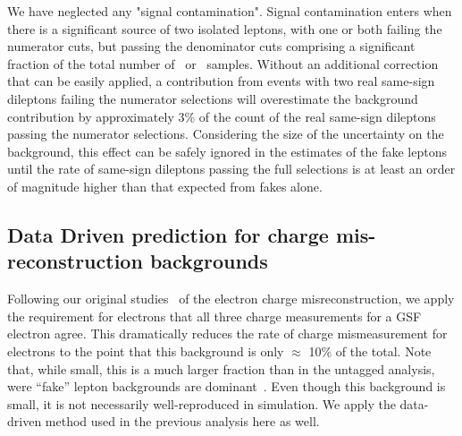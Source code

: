 We have neglected any "signal contamination". 
Signal contamination enters when there is a significant
source of two isolated leptons, with one or both failing the numerator cuts, but passing the denominator cuts
comprising  a significant fraction of the total number of \nNoNu\ or \nNoNo\ samples. 
Without an additional correction that can be easily applied,
a contribution from events with two real same-sign dileptons failing the numerator selections
 will overestimate the background contribution by approximately 3\% of the count of
the real same-sign dileptons passing the numerator selections.
Considering the size of the uncertainty on the background,
this effect can be safely ignored in the estimates 
of the fake leptons until the rate of same-sign dileptons passing the full
selections is at least an order of magnitude  higher than that expected
from fakes alone.


\subsection{Data Driven prediction for charge mis-reconstruction backgrounds}
\label{sec:flips}


Following our original studies~\cite{sspaper2010} of the electron charge misreconstruction, 
we apply the requirement for electrons that all three charge measurements for a GSF electron agree. 
This dramatically reduces the rate of charge mismeasurement for electrons to
the point that this background is only $\approx$ 10\% of the total.  Note 
that, while small, this is a much larger fraction than in
the untagged analysis, were ``fake'' lepton backgrounds are
dominant~\cite{sspaper2010,ssnote2011,sspaper2011}.
Even though this background is small, it is not necessarily 
well-reproduced in simulation.
We apply the data-driven method used in the previous 
analysis\cite{sspaper2010,ssnote2011,sspaper2011}
here
as well.

